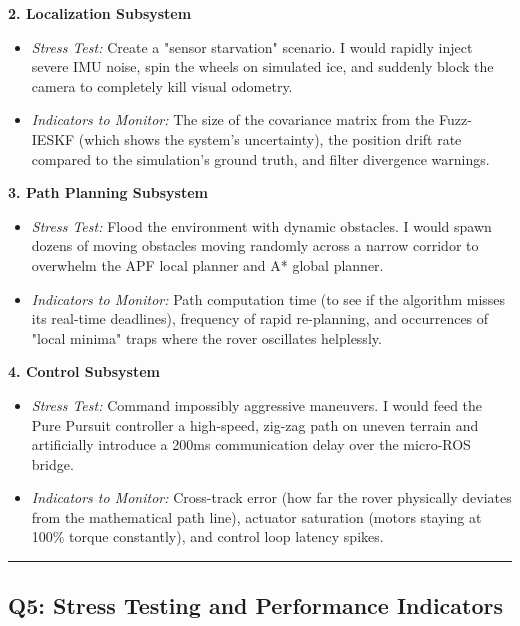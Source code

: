 \documentclass[12pt,a4paper]{article}
\begin{document}
\noindent\textbf{2. Localization Subsystem}
\begin{itemize}[leftmargin=*]
    \item \textit{Stress Test:} Create a "sensor starvation" scenario. I would rapidly inject severe IMU noise, spin the wheels on simulated ice, and suddenly block the camera to completely kill visual odometry.
    \item \textit{Indicators to Monitor:} The size of the covariance matrix from the Fuzz-IESKF (which shows the system's uncertainty), the position drift rate compared to the simulation's ground truth, and filter divergence warnings.
\end{itemize}

\noindent\textbf{3. Path Planning Subsystem}
\begin{itemize}[leftmargin=*]
    \item \textit{Stress Test:} Flood the environment with dynamic obstacles. I would spawn dozens of moving obstacles moving randomly across a narrow corridor to overwhelm the APF local planner and A* global planner.
    \item \textit{Indicators to Monitor:} Path computation time (to see if the algorithm misses its real-time deadlines), frequency of rapid re-planning, and occurrences of "local minima" traps where the rover oscillates helplessly.
\end{itemize}

\noindent\textbf{4. Control Subsystem}
\begin{itemize}[leftmargin=*]
    \item \textit{Stress Test:} Command impossibly aggressive maneuvers. I would feed the Pure Pursuit controller a high-speed, zig-zag path on uneven terrain and artificially introduce a 200ms communication delay over the micro-ROS bridge.
    \item \textit{Indicators to Monitor:} Cross-track error (how far the rover physically deviates from the mathematical path line), actuator saturation (motors staying at 100\% torque constantly), and control loop latency spikes.
\end{itemize}

\vspace{0.3em}
\noindent\rule{\textwidth}{0.4pt}
\vspace{0.3em}




\subsection{Q5: Stress Testing and Performance Indicators}
\end{document}
